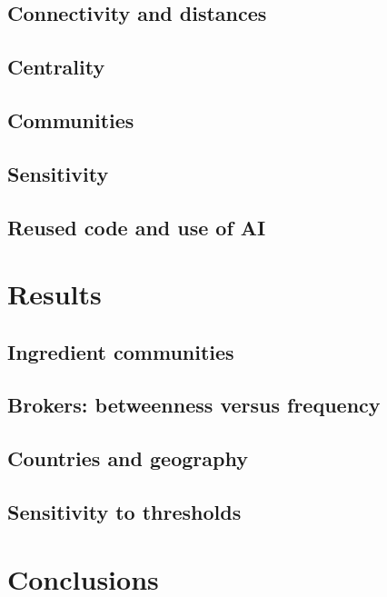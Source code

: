 \documentclass[10pt,a4paper]{article}
\begin{document}
\subsection{Connectivity and distances}\label{sec:connectivity}


\subsection{Centrality}


\subsection{Communities}


\subsection{Sensitivity}


\subsection{Reused code and use of AI}


\section{Results}


\subsection{Ingredient communities}


\subsection{Brokers: betweenness versus frequency}


\subsection{Countries and geography}


\subsection{Sensitivity to thresholds}\label{sec:res-sensitivity}


\section{Conclusions}




\end{document}

